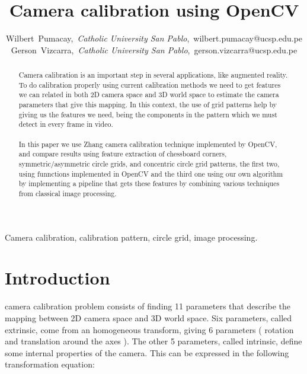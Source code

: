 \documentclass[journal]{IEEEtran}
\begin{document}
\title{Camera calibration using OpenCV}

\author{Wilbert~Pumacay,~\textit{Catholic University San Pablo},~wilbert.pumacay@ucsp.edu.pe\\
        Gerson~Vizcarra,~\textit{Catholic University San Pablo},~gerson.vizcarra@ucsp.edu.pe}

\maketitle

\begin{abstract}
Camera calibration is an important step in several applications, like augmented reality. To do calibration properly using current calibration methods we need to get features we can related in both 2D camera space and 3D world space to estimate the camera parameters that give this mapping. In this context, the use of grid patterns help by giving us the features we need, being the components in the pattern which we must detect in every frame in video.
\\
\\
In this paper we use Zhang \cite{CameraCalibration1} camera calibration technique implemented by OpenCV, and compare results using feature extraction of chessboard corners, symmetric/asymmetric circle grids, and concentric circle grid patterns, the first two, using funnctions implemented in OpenCV and the third one using our own algorithm by implementing a pipeline that gets these features by combining various techniques from classical image processing.
\end{abstract}

\begin{IEEEkeywords}
Camera calibration, calibration pattern, circle grid, image processing.
\end{IEEEkeywords}


\section{Introduction}

 camera calibration problem consists of finding 11 parameters that describe the mapping between 2D camera space and 3D world space. Six parameters, called extrinsic, come from an homogeneous transform, giving 6 parameters ( rotation and translation around the axes ). The other 5 parameters, called intrinsic, define some internal properties of the camera. This can be expressed in the following transformation equation:
\end{document}
